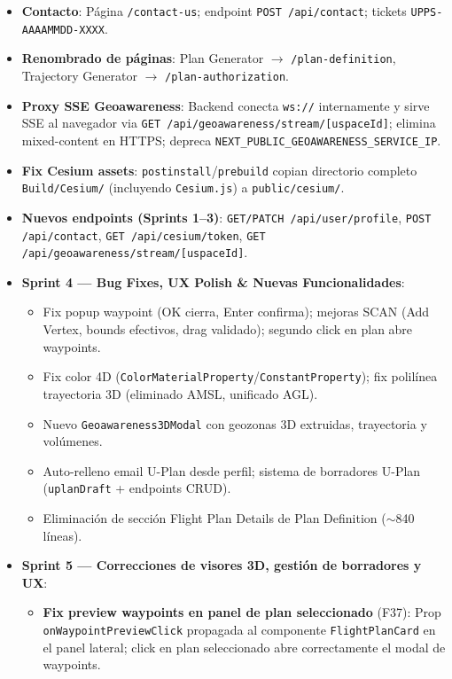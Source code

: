 \documentclass[12pt,a4paper]{article}
\begin{document}
\begin{itemize}
\begin{itemize}
        \item \textbf{Contacto}: Página \texttt{/contact-us}; endpoint \texttt{POST /api/contact}; tickets \texttt{UPPS-AAAAMMDD-XXXX}.
        \item \textbf{Renombrado de páginas}: Plan Generator $\rightarrow$ \texttt{/plan-definition}, Trajectory Generator $\rightarrow$ \texttt{/plan-authorization}.
        \item \textbf{Proxy SSE Geoawareness}: Backend conecta \texttt{ws://} internamente y sirve SSE al navegador via \texttt{GET /api/geoawareness/stream/[uspaceId]}; elimina mixed-content en HTTPS; depreca \texttt{NEXT\_PUBLIC\_GEOAWARENESS\_SERVICE\_IP}.
        \item \textbf{Fix Cesium assets}: \texttt{postinstall}/\texttt{prebuild} copian directorio completo \texttt{Build/Cesium/} (incluyendo \texttt{Cesium.js}) a \texttt{public/cesium/}.
        \item \textbf{Nuevos endpoints (Sprints 1--3)}: \texttt{GET/PATCH /api/user/profile}, \texttt{POST /api/contact}, \texttt{GET /api/cesium/token}, \texttt{GET /api/geoawareness/stream/[uspaceId]}.
        \item \textbf{Sprint 4 --- Bug Fixes, UX Polish \& Nuevas Funcionalidades}:
        \begin{itemize}
            \item Fix popup waypoint (OK cierra, Enter confirma); mejoras SCAN (Add Vertex, bounds efectivos, drag validado); segundo click en plan abre waypoints.
            \item Fix color 4D (\texttt{ColorMaterialProperty}/\texttt{ConstantProperty}); fix polilínea trayectoria 3D (eliminado AMSL, unificado AGL).
            \item Nuevo \texttt{Geoawareness3DModal} con geozonas 3D extruidas, trayectoria y volúmenes.
            \item Auto-relleno email U-Plan desde perfil; sistema de borradores U-Plan (\texttt{uplanDraft} + endpoints CRUD).
            \item Eliminación de sección Flight Plan Details de Plan Definition ($\sim$840 líneas).
        \end{itemize}
        \item \textbf{Sprint 5 --- Correcciones de visores 3D, gestión de borradores y UX}:
        \begin{itemize}
            \item \textbf{Fix preview waypoints en panel de plan seleccionado} (F37): Prop \texttt{onWaypointPreviewClick} propagada al componente \texttt{FlightPlanCard} en el panel lateral; click en plan seleccionado abre correctamente el modal de waypoints.

\end{itemize}
\end{itemize}
\end{itemize}
\end{document}
